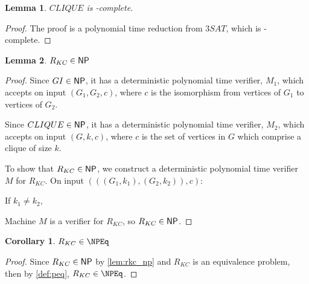 \documentclass[draft]{article}
\newtheorem{lemma}{Lemma}%
\newtheorem{corollary}{Corollary}%
\theoremstyle{definition}
\begin{document}
\begin{lemma}$CLIQUE$ is \NP-complete.\end{lemma}
\begin{proof}
  The proof is a polynomial time reduction from $3SAT$, which is \NP-complete.
\end{proof}

\begin{lemma}\label{lem:rkc_np}$R_{KC}\in{\ensuremath{\mathsf{NP}}}$\end{lemma}
\begin{proof}
  Since $GI\in{\ensuremath{\mathsf{NP}}}$, it has a deterministic polynomial time verifier, $M_1$,
  which accepts on input $(G_1, G_2, c)$, where $c$ is the isomorphism from
  vertices of $G_1$ to vertices of $G_2$.

  Since $CLIQUE\in{\ensuremath{\mathsf{NP}}}$, it has a deterministic polynomial time verifier, $M_2$,
  which accepts on input $(G, k, c)$, where $c$ is the set of vertices in $G$
  which comprise a clique of size $k$.

  To show that $R_{KC}\in{\ensuremath{\mathsf{NP}}}$, we construct a deterministic polynomial time
  verifier $M$ for $R_{KC}$. On input $(((G_1, k_1), (G_2, k_2)), c)$:\\
  \begin{algorithm}[H]
    If $k_1\neq k_2$, \REJECT\;
  \end{algorithm}
  
  Machine $M$ is a verifier for $R_{KC}$, so $R_{KC}\in{\ensuremath{\mathsf{NP}}}$.
\end{proof}

\begin{corollary}\label{cor:rkc_npeq}$R_{KC}\in\NPEq$\end{corollary}
\begin{proof}
  Since $R_{KC}\in{\ensuremath{\mathsf{NP}}}$ by \autoref{lem:rkc_np} and $R_{KC}$ is an equivalence
  problem, then by \autoref{def:peq}, $R_{KC}\in\NPEq$.
\end{proof}
\end{document}

